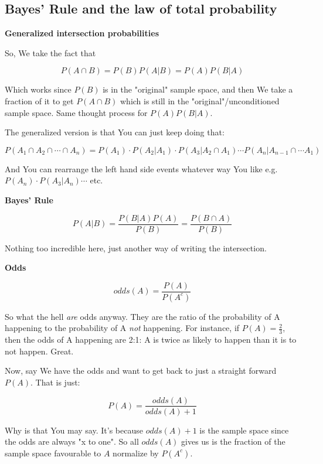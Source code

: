 \documentclass{article}
\begin{document}
	\subsection{Bayes' Rule and the law of total probability}
		
		\textbf{Generalized intersection probabilities}
			
			So, We take the fact that 
				
			$$P(A\cap B) = P(B)P(A\vert B) = P(A)P(B\vert A)$$
				
			Which works since $P(B)$ is in the "original" sample space, and then We  take a fraction of it to get $P(A\cap B)$ which is still in the "original"/unconditioned sample space. Same thought process for $P(A)P(B\vert A)$.
				
			The generalized version is that You can just keep doing that:
				
			$$P(A_1\cap A_2\cap\cdots\cap A_n) = P(A_1)\cdot P(A_2\vert A_1) \cdot P(A_3\vert A_2\cap A_1)\cdots P(A_n\vert A_{n-1}\cap\cdots A_1)$$
				
			And You can rearrange the left hand side events whatever way You like e.g. $P(A_n)\cdot P(A_3 \vert A_n)\cdots$ etc.
				
		\newpage
				
		\textbf{Bayes' Rule}
			
			$$P(A\vert B) = \frac{P(B\vert A)P(A)}{P(B)} = \frac{P(B\cap A)}{P(B)}$$
				
			Nothing too incredible here, just another way of writing the intersection.
				
		\hfill
			
		\textbf{Odds}
			
			$$odds(A) = \frac{P(A)}{P(A^c)}$$
				
			So what the hell \textit{are} odds anyway. They are the ratio of the probability of A happening to the probability of A \textit{not} happening. For instance, if $P(A) =  \frac{2}{3}$, then the odds of A happening are 2:1: A is twice as likely to happen than it is to not happen. Great.
				
			Now, say We have the odds and want to get back to just a straight forward $P(A)$. That is just:
				
			$$P(A) = \frac{odds(A)}{odds(A) + 1}$$
				
			Why is that You may say. It's because $odds(A)+1$ is the sample space since the odds are always "x to one". So all $odds(A)$ gives us is the fraction of the sample space favourable to $A$ normalize by $P(A^c)$.
				
\end{document}
